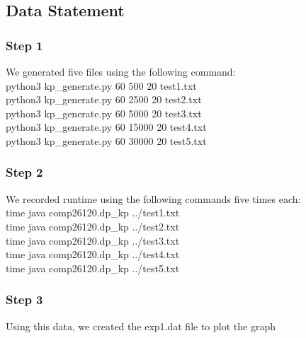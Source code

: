 \documentclass[a4]{article}
\begin{document}
\subsection{Data Statement}
\subsubsection{Step 1}
We generated five files using the following command:\\
python3 kp\_generate.py 60 500 20 test1.txt\\
python3 kp\_generate.py 60 2500 20 test2.txt\\
python3 kp\_generate.py 60 5000 20 test3.txt\\
python3 kp\_generate.py 60 15000 20 test4.txt\\
python3 kp\_generate.py 60 30000 20 test5.txt\\
\subsubsection{Step 2}
We recorded runtime using the following commands five times each:\\
time java comp26120.dp\_kp ../test1.txt\\
time java comp26120.dp\_kp ../test2.txt\\
time java comp26120.dp\_kp ../test3.txt\\
time java comp26120.dp\_kp ../test4.txt\\
time java comp26120.dp\_kp ../test5.txt\\
\subsubsection{Step 3}
Using this data, we created the exp1.dat file to plot the graph
\appendix

\end{document}
